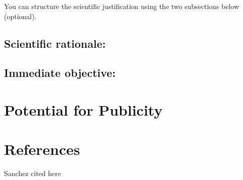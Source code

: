 \documentclass[12pt,a4paper]{article}
\begin{document}
You can structure the scientific justification using the two subsections below (optional).

\subsection{Scientific rationale:}


\subsection{Immediate objective:}



\section{Potential for Publicity}




\section{References}


Sanchez cited here \citet{sanchez12}



\end{document}
